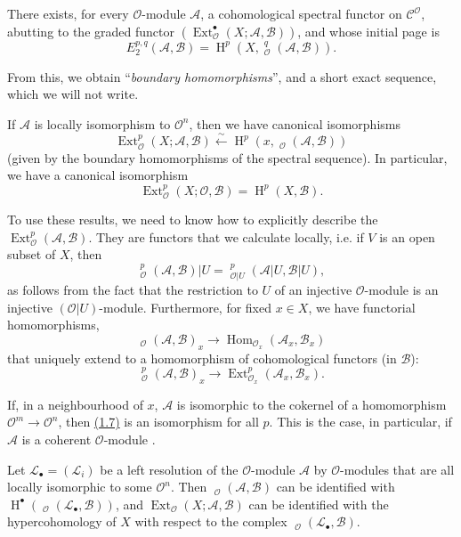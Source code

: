 \documentclass{article}
\theoremstyle{plain}
\newenvironment{proposition}[1]
  {\renewcommand\theinnerproposition{#1}\innerproposition}
  {\endinnerproposition}
\newenvironment{corollary}[1]
  {\renewcommand\theinnercorollary{#1}\innercorollary}
  {\endinnercorollary}
\theoremstyle{definition}
\newcommand{\scr}[1]{{\mathscr{#1}}}
\renewcommand{\cal}[1]{{\mathcal{#1}}}
\DeclareMathOperator{\Ext}{Ext}
\DeclareMathOperator{\Hom}{Hom}
\DeclareMathOperator{\shExt}{\underline{Ext}}
\DeclareMathOperator{\shHom}{\underline{Hom}}
\DeclareMathOperator{\HH}{H}
\newcommand{\oldpage}[1]{\marginpar{\footnotesize$\Big\vert$ \textit{p.~#1}}}
\begin{document}
\begin{proposition}{1}
\label{proposition1}
  There exists, for every $\scr{O}$-module $\scr{A}$, a cohomological spectral functor on $\cal{C}^\scr{O}$, abutting to the graded functor $(\Ext_\scr{O}^\bullet(X;\scr{A},\scr{B}))$, and whose initial page is
  \[
  \label{1.4}
    E_2^{p,q}(\scr{A},\scr{B}) = \HH^p(X,\shExt_\scr{O}^q(\scr{A},\scr{B})).
  \tag{1.4}
  \]
\end{proposition}

From this, we obtain ``\emph{boundary homomorphisms}'', and a short exact sequence, which we will not write.

\begin{corollary}{1}
\label{proposition1corollary1}
  If $\scr{A}$ is locally isomorphism to $\scr{O}^n$, then we have canonical isomorphisms
  \[
  \label{1.5}
    \Ext_\scr{O}^p(X;\scr{A},\scr{B}) \xleftarrow{\sim} \HH^p(x,\shHom_\scr{O}(\scr{A},\scr{B}))
  \tag{1.5}
  \]
  (given by the boundary homomorphisms of the spectral sequence).
  In particular, we have a canonical isomorphism
  \[
  \label{1.6}
    \Ext_\scr{O}^p(X;\scr{O},\scr{B}) = \HH^p(X,\scr{B}).
  \tag{1.6}
  \]
\end{corollary}

To use these results, we need to know how to explicitly describe the $\Ext_\scr{O}^p(\scr{A},\scr{B})$.
They are functors that we calculate locally, i.e. if $V$ is an open subset of $X$, then
\[
  \shExt_\scr{O}^p(\scr{A},\scr{B})|U = \shExt_{\scr{O}|U}^p(\scr{A}|U,\scr{B}|U),
\]
as follows from the fact that the restriction to $U$ of an injective $\scr{O}$-module is an injective $(\scr{O}|U)$-module.
Furthermore, for fixed $x\in X$, we have functorial homomorphisms,
\[
\label{1.7}
  \shHom_\scr{O}(\scr{A},\scr{B})_x \to \Hom_{\scr{O}_x}(\scr{A}_x,\scr{B}_x)
\tag{1.7}
\]
that uniquely extend to a homomorphism of cohomological functors (in $\scr{B}$):
\[
\label{1.8}
  \shExt_\scr{O}^p(\scr{A},\scr{B})_x \to \Ext_{\scr{O}_x}^p(\scr{A}_x,\scr{B}_x).
\tag{1.8}
\]

\begin{proposition}{2}
\label{proposition2}
  If, in a neighbourhood of $x$, $\scr{A}$ is isomorphic to the cokernel of a homomorphism $\scr{O}^m\to\scr{O}^n$, then \hyperref[1.7]{(1.7)} is an isomorphism for all $p$.
  This is the case, in particular, if $\scr{A}$ is a coherent $\scr{O}$-module \cite{3}.
\end{proposition}

\oldpage{149-03}
\begin{proposition}{3}
\label{proposition3}
  Let $\scr{L}_\bullet=(\scr{L}_i)$ be a left resolution of the $\scr{O}$-module $\scr{A}$ by $\scr{O}$-modules that are all locally isomorphic to some $\scr{O}^n$.
  Then $\shExt_\scr{O}(\scr{A},\scr{B})$ can be identified with $\HH^\bullet(\shHom_\scr{O}(\scr{L}_\bullet,\scr{B}))$, and $\Ext_\scr{O}(X;\scr{A},\scr{B})$ can be identified with the hypercohomology of $X$ with respect to the complex $\shHom_\scr{O}(\scr{L}_\bullet,\scr{B})$.
\end{proposition}
\end{document}
